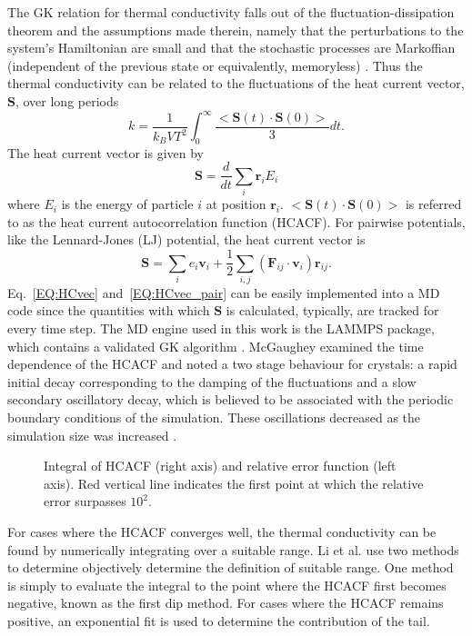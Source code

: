 The GK relation for thermal conductivity falls out of the fluctuation-dissipation theorem and the assumptions made therein, namely that the perturbations to the system's Hamiltonian are small and that the stochastic processes are Markoffian (independent of the previous state or equivalently, memoryless) \cite{green:398}. Thus the thermal conductivity can be related to the fluctuations of the heat current vector, $\bm{S}$, over long periods
%
\begin{equation}\label{EQ:intHCACF}
k=\frac{1}{k_B V T^2}\int_0^{\infty}\frac{<\bm{S}(t)\cdot\bm{S}(0)>}{3}dt.
\end{equation}
%
The heat current vector is given by 
%
\begin{equation}\label{EQ:HCvec}
\bm{S}=\frac{d}{dt}\sum_i\bm{r}_iE_i
\end{equation}
%
where $E_i$ is the energy of particle $i$ at position $\bm{r}_i$. $<\bm{S}(t)\cdot\bm{S}(0)>$ is referred to as the heat current autocorrelation function (HCACF). For pairwise potentials, like the Lennard-Jones (LJ) potential, the heat current vector is
%
\begin{equation}\label{EQ:HCvec_pair}
\bm{S}=\sum_ie_i\bm{v}_i+\frac{1}{2}\sum_{i,j}(\bm{F}_{ij}\cdot\bm{v}_{i})\bm{r}_{ij}.
\end{equation}
%
Eq.~\ref{EQ:HCvec} and~\ref{EQ:HCvec_pair} can be easily implemented into a MD code since the quantities with which $\bm{S}$ is calculated, typically, are tracked for every time step. The MD engine used in this work is  the LAMMPS package, which contains a validated GK algorithm \cite{LAMMPS}. McGaughey examined the time dependence of the HCACF and noted a two stage behaviour for crystals: a rapid initial decay corresponding to the damping of the fluctuations and a slow secondary oscillatory decay, which is believed to be associated with the periodic boundary conditions of the simulation. These oscillations decreased as the simulation size was increased \cite{mcgaugheythesis}.
%
\begin{figure}
\begin{center}
\renewcommand{\figure}{Fig.}
\caption{Integral of HCACF (right axis) and relative error function (left axis). Red vertical line indicates the first point at which the relative error surpasses $10^2$.}
\label{FIG:GK_bulk}
\end{center}
\end{figure}
%
For cases where the HCACF converges well, the thermal conductivity can be found by numerically integrating over a suitable range. Li et al. \cite{Li1998139} use two methods to determine objectively determine the definition of suitable range. One method is simply to evaluate the integral to the point where the HCACF first becomes negative, known as the first dip method. For cases where the HCACF remains positive, an exponential fit is used to determine the contribution of the tail.

